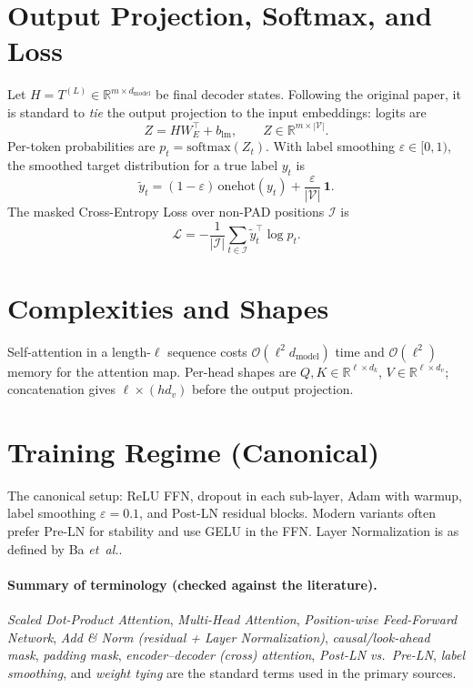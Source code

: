 \documentclass[11pt]{article}
\begin{document}
\section{Output Projection, Softmax, and Loss}
Let $H = T^{(L)}\in\mathbb{R}^{m\times d_{\text{model}}}$ be final decoder states. Following the original paper, it is standard to \emph{tie} the output projection to the input embeddings: logits are
\begin{equation}
Z = H W_E^{\top} + b_{\text{lm}},\qquad Z\in\mathbb{R}^{m\times |\mathcal{V}|}.
\label{eq:lm_logits}
\end{equation}
Per-token probabilities are $p_t = \mathrm{softmax}(Z_t)$. With label smoothing $\varepsilon\in[0,1)$, the smoothed target distribution for a true label $y_t$ is
\begin{equation}
\tilde{y}_t = (1-\varepsilon)\,\mathrm{onehot}(y_t) + \frac{\varepsilon}{|\mathcal{V}|}\,\bm{1}.
\label{eq:label_smoothing}
\end{equation}
The masked Cross-Entropy Loss over non-PAD positions $\mathcal{I}$ is
\begin{equation}
\mathcal{L} = - \frac{1}{|\mathcal{I}|}\sum_{t\in\mathcal{I}} \tilde{y}_t^{\top}\log p_t. \label{eq:loss}
\end{equation}

\section{Complexities and Shapes}
Self-attention in a length-$\ell$ sequence costs $\mathcal{O}(\ell^2 d_{\text{model}})$ time and $\mathcal{O}(\ell^2)$ memory for the attention map. Per-head shapes are $Q,K\in\mathbb{R}^{\ell\times d_k}$, $V\in\mathbb{R}^{\ell\times d_v}$; concatenation gives $\ell\times (hd_v)$ before the output projection.

\section{Training Regime (Canonical)}
The canonical setup: ReLU FFN, dropout in each sub-layer, Adam with warmup, label smoothing $\varepsilon=0.1$, and Post-LN residual blocks. Modern variants often prefer Pre-LN for stability and use GELU in the FFN.
Layer Normalization is as defined by Ba \emph{et~al.}.

\paragraph{Summary of terminology (checked against the literature).}
\emph{Scaled Dot-Product Attention}, \emph{Multi-Head Attention}, \emph{Position-wise Feed-Forward Network}, \emph{Add \& Norm (residual + Layer Normalization)}, \emph{causal/look-ahead mask}, \emph{padding mask}, \emph{encoder--decoder (cross) attention}, \emph{Post-LN vs.\ Pre-LN}, \emph{label smoothing}, and \emph{weight tying} are the standard terms used in the primary sources.
\end{document}
